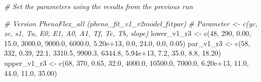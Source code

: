 \documentclass[
]{article}
\newenvironment{Shaded}{\begin{snugshade}}{\end{snugshade}}
\newcommand{\CommentTok}[1]{\textcolor[rgb]{0.56,0.35,0.01}{\textit{#1}}}
\newcommand{\DecValTok}[1]{\textcolor[rgb]{0.00,0.00,0.81}{#1}}
\newcommand{\FloatTok}[1]{\textcolor[rgb]{0.00,0.00,0.81}{#1}}
\newcommand{\FunctionTok}[1]{\textcolor[rgb]{0.00,0.00,0.00}{#1}}
\newcommand{\NormalTok}[1]{#1}
\newcommand{\OtherTok}[1]{\textcolor[rgb]{0.56,0.35,0.01}{#1}}
\begin{document}
\begin{Shaded}
\begin{Highlighting}[]
\CommentTok{\# Set the parameters using the results from the previous run}

\CommentTok{\# Version PhenoFlex\_all (pheno\_fit\_v1\_r2$model\_fit$par)}
\CommentTok{\# Parameter \textless{}{-} c(yc, zc,    s1,   Tu,     E0,      E1,     A0,       A1,   Tf,   Tc,   Tb, slope)}
\NormalTok{lower\_v1\_r3 }\OtherTok{\textless{}{-}} \FunctionTok{c}\NormalTok{(}\DecValTok{48}\NormalTok{, }\DecValTok{290}\NormalTok{, }\FloatTok{0.00}\NormalTok{, }\FloatTok{15.0}\NormalTok{, }\FloatTok{3000.0}\NormalTok{,  }\FloatTok{9000.0}\NormalTok{, }\FloatTok{6000.0}\NormalTok{, }\FloatTok{5.20e+13}\NormalTok{,  }\FloatTok{0.0}\NormalTok{, }\FloatTok{24.0}\NormalTok{,  }\FloatTok{0.0}\NormalTok{,  }\FloatTok{0.05}\NormalTok{)}
\NormalTok{par\_v1\_r3   }\OtherTok{\textless{}{-}} \FunctionTok{c}\NormalTok{(}\DecValTok{58}\NormalTok{, }\DecValTok{332}\NormalTok{, }\FloatTok{0.39}\NormalTok{, }\FloatTok{22.1}\NormalTok{, }\FloatTok{3310.5}\NormalTok{,  }\FloatTok{9900.3}\NormalTok{, }\FloatTok{6344.8}\NormalTok{, }\FloatTok{5.94e+13}\NormalTok{,  }\FloatTok{7.2}\NormalTok{, }\FloatTok{35.0}\NormalTok{,  }\FloatTok{8.8}\NormalTok{, }\FloatTok{18.20}\NormalTok{)}
\NormalTok{upper\_v1\_r3 }\OtherTok{\textless{}{-}} \FunctionTok{c}\NormalTok{(}\DecValTok{68}\NormalTok{, }\DecValTok{370}\NormalTok{, }\FloatTok{0.65}\NormalTok{, }\FloatTok{32.0}\NormalTok{, }\FloatTok{4000.0}\NormalTok{, }\FloatTok{10500.0}\NormalTok{, }\FloatTok{7000.0}\NormalTok{, }\FloatTok{6.20e+13}\NormalTok{, }\FloatTok{11.0}\NormalTok{, }\FloatTok{44.0}\NormalTok{, }\FloatTok{11.0}\NormalTok{, }\FloatTok{35.00}\NormalTok{)}



\end{Highlighting}
\end{Shaded}
\end{document}

